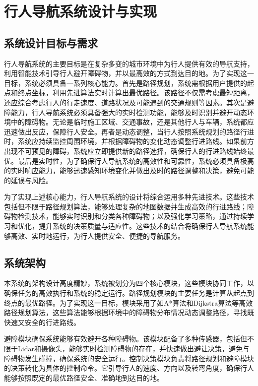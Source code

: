 \chapter{行人导航系统设计与实现}

\section{系统设计目标与需求}
行人导航系统的主要目标是在复杂多变的城市环境中为行人提供有效的导航支持，利用智能技术引导行人避开障碍物，并以最高效的方式到达目的地。为了实现这一目标，系统必须具备一系列核心能力。首先是路径规划，系统需根据用户提供的起点和终点坐标，利用先进算法实时计算出最优路径。该路径不仅需考虑最短距离，还应综合考虑行人的行走速度、道路状况及可能遇到的交通规则等因素。其次是避障能力，行人导航系统必须具备强大的实时检测功能，能够及时识别并避开动态环境中的障碍物。无论是临时施工区域、交通事故，还是其他行人与车辆，系统都应迅速做出反应，保障行人安全。再者是动态调整，当行人按照系统规划的路径行进时，系统应持续监控周围环境，并根据障碍物的变化动态调整行进路线。如果前方出现不可预见的障碍，系统应立即提供新的路径选择，确保行人的行进路线始终最优。最后是实时性，为了确保行人导航系统的高效性和可靠性，系统必须具备极高的实时响应能力，能够迅速感知环境变化并做出及时的路径调整和决策，避免可能的延误与风险。

为了实现上述核心能力，行人导航系统的设计将综合运用多种先进技术。这些技术包括但不限于路径规划算法，能够处理复杂的地图数据并生成高效的行进路线；障碍物检测技术，能够实时识别和分类各种障碍物；以及强化学习策略，通过持续学习和优化，提升系统的决策质量与适应性。这些技术的结合将确保行人导航系统能够高效、实时地运行，为行人提供安全、便捷的导航服务。

\section{系统架构}
本系统的架构设计高度精妙，系统被划分为四个核心模块，这些模块协同工作，以确保任务的高效执行和系统的稳定运行。路径规划模块的主要任务是计算从起点到终点的最优路径。为了实现这一目标，模块采用了如A*算法和Dijkstra算法等高效路径规划算法，这些算法能够根据环境中的障碍物分布情况动态调整路径，寻找既快速又安全的行进路线。

避障模块确保系统能够有效避开各种障碍物。该模块配备了多种传感器，包括但不限于Lidar和摄像头，能够实时检测障碍物的存在，并快速做出避让决策，避免与障碍物发生碰撞，确保系统的安全运行。控制决策模块负责将路径规划和避障模块的决策转化为具体的控制命令。它引导行人的速度、方向以及转弯角度，确保行人能够按照既定的最优路径安全、准确地到达目的地。

